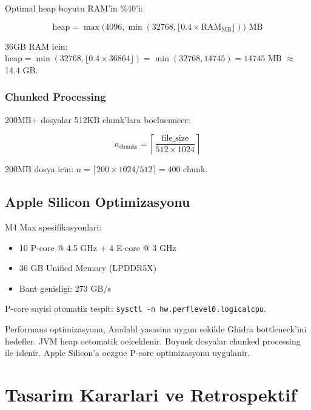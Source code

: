 \documentclass[12pt,a4paper,oneside]{book}
\theoremstyle{definition}
\newcommand{\code}[1]{\texttt{\color{green!60!white}#1}}
\begin{document}
Optimal heap boyutu RAM'in \%40'i:

\begin{equation}
\text{heap} = \max\!\big(4096, \min(32768, \lfloor 0.4 \times \text{RAM}_{\text{MB}} \rfloor)\big) \text{ MB}
\end{equation}

36GB RAM icin: $\text{heap} = \min(32768, \lfloor 0.4 \times 36864 \rfloor) = \min(32768, 14745) = 14745$ MB $\approx$ 14.4 GB.

\subsection{Chunked Processing}

200MB+ dosyalar 512KB chunk'lara boeluenueer:

\begin{equation}
n_{\text{chunks}} = \left\lceil \frac{\text{file\_size}}{512 \times 1024} \right\rceil
\end{equation}

200MB dosya icin: $n = \lceil 200 \times 1024 / 512 \rceil = 400$ chunk.

\section{Apple Silicon Optimizasyonu}
\label{sec:apple-silicon}

M4 Max spesifikasyonlari:
\begin{itemize}
\item 10 P-core @ 4.5 GHz + 4 E-core @ 3 GHz
\item 36 GB Unified Memory (LPDDR5X)
\item Bant genisligi: 273 GB/s
\end{itemize}

P-core sayisi otomatik tespit: \code{sysctl -n hw.perflevel0.logicalcpu}.

\begin{ozet}
Performans optimizasyonu, Amdahl yasasina uygun sekilde Ghidra bottleneck'ini hedefler. JVM heap oetomatik oelceklenir. Buyuek dosyalar chunked processing ile islenir. Apple Silicon'a oezgue P-core optimizasyonu uygulanir.
\end{ozet}


\chapter{Tasarim Kararlari ve Retrospektif}
\label{ch:retrospektif}
\end{document}
